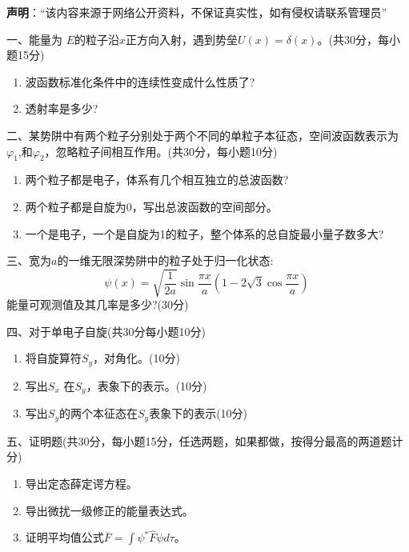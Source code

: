 
\textbf{声明}：“该内容来源于网络公开资料，不保证真实性，如有侵权请联系管理员”

一、能量为 $E$的粒子沿$x$正方向入射，遇到势垒$U(x)=\delta(x)$。(共30分，每小题15分)
\begin{enumerate}
\item 波函数标准化条件中的连续性变成什么性质了?
\item 透射率是多少?
\end{enumerate}

二、某势阱中有两个粒子分别处于两个不同的单粒子本征态，空间波函数表示为$\varphi_1$,和$\varphi_2$，忽略粒子间相互作用。(共30分，每小题10分)
\begin{enumerate}
\item 两个粒子都是电子，体系有几个相互独立的总波函数?
\item 两个粒子都是自旋为0，写出总波函数的空间部分。
\item 一个是电子，一个是自旋为1的粒子，整个体系的总自旋最小量子数多大?
\end{enumerate}

三、宽为$a$的一维无限深势阱中的粒子处于归一化状态:
$$\psi(x) = \sqrt{\frac{1}{2a}} \sin  \frac{\pi x}{a} \left(1 - 2 \sqrt{3} \cos  \frac{\pi x}{a} \right)~$$
能量可观测值及其几率是多少?(30分)

四、对于单电子自旋(共30分每小题10分)
\begin{enumerate}
\item 将自旋算符$S_y$，对角化。(10分)
\item 写出$S_x$ 在$S_y$，表象下的表示。(10分)
\item 写出$S_y$的两个本征态在$S_y$表象下的表示(10分)
\end{enumerate}

五、证明题(共30分，每小题15分，任选两题，如果都做，按得分最高的两道题计分)
\begin{enumerate}
\item 导出定态薛定谔方程。
\item 导出微扰一级修正的能量表达式。
\item 证明平均值公式$\overline{F} = \int \psi^* \hat{F} \psi d\tau$。
\end{enumerate}
